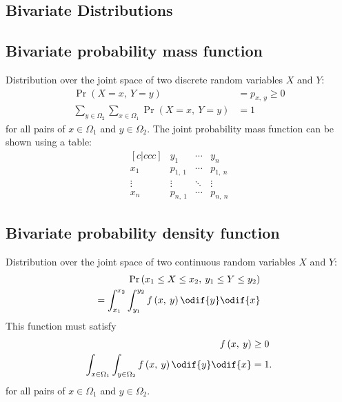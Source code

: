 \documentclass{article}
\begin{document}
\begin{multicols}{3}
    \section{Bivariate Distributions}
    \subsection{Bivariate probability mass function}
    Distribution over the joint space of two discrete random variables \(X\) and \(Y\):
    \begin{align*}
        \Pr{\left( X = x,\: Y = y \right)}                                             & = p_{x,\: y} \geq 0 \\
        \sum_{y \in \Omega_2} \sum_{x \in \Omega_1} \Pr{\left( X = x,\: Y = y \right)} & = 1
    \end{align*}
    for all pairs of \(x \in \Omega_1\) and \(y \in \Omega_2\).
    The joint probability mass function can be shown using a table:
    {\small
    \begin{equation*}
        \begin{matrix}[c|ccc] %
                   & y_1        & \cdots & y_n        \\
            \hline %
            x_1    & p_{1,\: 1} & \cdots & p_{1,\: n} \\
            \vdots & \vdots     & \ddots & \vdots     \\
            x_n    & p_{n,\: 1} & \cdots & p_{n,\: n}
        \end{matrix}
    \end{equation*}
    }
    \subsection{Bivariate probability density function}
    Distribution over the joint space of two continuous random variables \(X\) and \(Y\):
    \begin{align*}
        \Pr{\left( x_1 \leq X \leq x_2,\: y_1 \leq Y \leq y_2 \right)} \\
        = \int_{x_1}^{x_2} \int_{y_1}^{y_2} f\left( x,\: y \right) \odif{y} \odif{x}
    \end{align*}
    This function must satisfy
    \begin{align*}
        f\left( x,\: y \right)                                                               & \geq 0 \\
        \int_{x \in \Omega_1} \int_{y \in \Omega_2} f\left( x,\: y \right) \odif{y} \odif{x} & = 1.
    \end{align*}
    for all pairs of \(x \in \Omega_1\) and \(y \in \Omega_2\).

\end{multicols}
\end{document}
